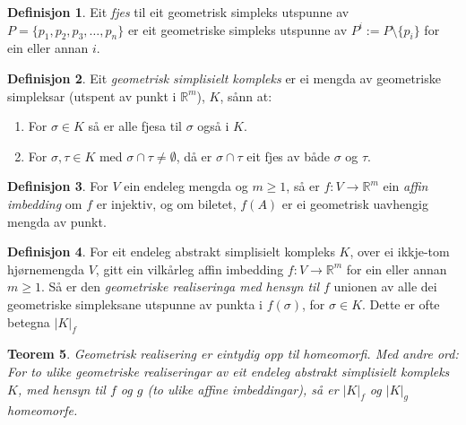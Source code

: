 \documentclass[a4paper, titlepage, 12pt, norsk]{article}
\theoremstyle{plain}
\newtheorem{theorem}{Teorem}[section]
\theoremstyle{definition}
\newtheorem{definition}[theorem]{Definisjon}
\newcommand{\R}{\mathbb{R}}
\begin{document}
\begin{definition}
	Eit \emph{fjes} til eit geometrisk simpleks utspunne av $P=\{p_1, p_2, p_3, \dots, p_n\}$ er eit geometriske simpleks utspunne av $P^i := P\setminus \{p_i\}$ for ein eller annan $i$.
\end{definition}
\begin{definition} %
	Eit \emph{geometrisk simplisielt kompleks} er ei mengda av geometriske simpleksar (utspent av punkt i $\R^m$), $K$, sånn at:
	\begin{enumerate}
		\item{For $\sigma \in K$ så er alle fjesa til $\sigma$ også i $K$.}
		\item{For $\sigma, \tau \in K$ med $\sigma \cap \tau \neq \emptyset$, då er $\sigma \cap \tau$ eit fjes av både $\sigma$ og $\tau$.}
	\end{enumerate}
\end{definition}
\begin{definition}
	For $V$ ein endeleg mengda og $m\geq1$, så er $f:V\rightarrow \R^m$ ein \emph{affin imbedding} om $f$ er injektiv, og om biletet, $f(A)$ er ei geometrisk uavhengig mengda av punkt.
\end{definition}
\begin{definition}
	For eit endeleg abstrakt simplisielt kompleks $K$, over ei ikkje-tom hjørnemengda $V$, gitt ein vilkårleg affin imbedding $f:V\to\R^m$ for ein eller annan $m\geq1$. Så er den \emph{geometriske realiseringa med hensyn til $f$} unionen av alle dei geometriske simpleksane utspunne av punkta i $f(\sigma)$, for $\sigma\in K$. Dette er ofte betegna $|K|_f$
\end{definition}
\begin{theorem}
	Geometrisk realisering er eintydig opp til homeomorfi. Med andre ord: For to ulike geometriske realiseringar av eit endeleg abstrakt simplisielt kompleks $K$, med hensyn til $f$ og $g$ (to ulike affine imbeddingar), så er $|K|_f$ og $|K|_g$ homeomorfe.
\end{theorem}
\end{document}
